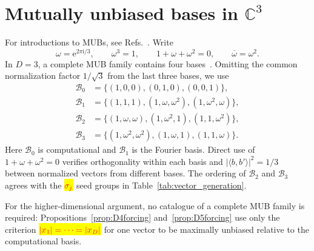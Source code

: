 \documentclass[%
  reprint,
  superscriptaddress,
  showpacs,
  showkeys,
  amsmath,amssymb,
  pra,
  longbibliography,
  floatfix,
  x11names
]{revtex4-2}
\newcommand{\ii}{\mathrm{i}}
\newenvironment{revision}{\begingroup}{\endgroup}
\newcommand{\corrmath}[1]{\begingroup\setlength{\fboxsep}{1pt}\colorbox{yellow}{\ensuremath{\color{red}#1}}\endgroup}
\begin{document}


\bigskip
\appendix

\begin{revision}
\section{Mutually unbiased bases in $\mathbb{C}^3$}
\label{appendix:MUBsD3}

For introductions to MUBs, see Refs.~\cite{Schwinger.60,WooFie,Brierley2009,springerlink:10.1007/978-3-540-24633-6_10,durt,mcnulty2024mutually}.  Write
\[
\omega=\mathrm{e}^{2\pi\ii{}/3},\qquad
\omega^3=1,\qquad 1+\omega+\omega^2=0,
\qquad \overline{\omega}=\omega^2.
\]
In $D=3$, a complete MUB family contains four bases~\cite{ivanovic-1997}.  Omitting the common normalization factor $1/\sqrt{3}$ from the last three bases, we use
\begin{align}
\mathcal{B}_0&=\{(1,0,0),(0,1,0),(0,0,1)\}, \label{eq:B0_3}\\
\mathcal{B}_1&=\{(1,1,1),(1,\omega,\omega^2),(1,\omega^2,\omega)\}, \label{eq:B1_3}\\
\mathcal{B}_2&=\{(1,\omega,\omega),(1,\omega^2,1),(1,1,\omega^2)\}, \label{eq:B2_3}\\
\mathcal{B}_3&=\{(1,\omega^2,\omega^2),(1,\omega,1),(1,1,\omega)\}. \label{eq:B3_3}
\end{align}
Here $\mathcal{B}_0$ is computational and $\mathcal{B}_1$ is the Fourier basis.  Direct use of $1+\omega+\omega^2=0$ verifies orthogonality within each basis and $|\langle b,b'\rangle|^2=1/3$ between normalized vectors from different bases.  The ordering of $\mathcal{B}_2$ and $\mathcal{B}_3$ agrees with the \corrmath{\sigma_j} seed groups in Table~\ref{tab:vector_generation}.

For the higher-dimensional argument, no catalogue of a complete MUB family is required: Propositions~\ref{prop:D4forcing} and~\ref{prop:D5forcing} use only the criterion \corrmath{|x_1|=\cdots=|x_D|} for one vector to be maximally unbiased relative to the computational basis.
\end{revision}
\end{document}
